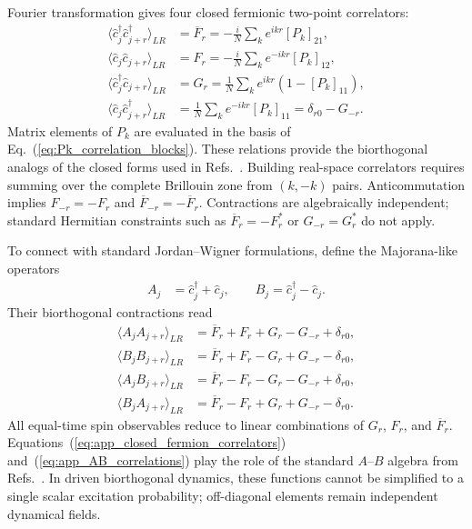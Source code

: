 \documentclass[aps,prb,reprint,superscriptaddress,amsmath,amssymb,floatfix]{revtex4-2}
\begin{document}
  Fourier transformation gives four closed fermionic two-point correlators:
\begin{equation}
\begin{aligned}
\langle \hat c_j^\dagger\hat c_{j+r}^\dagger \rangle_{LR} &= \overline F_r = -\frac{i}{N} \sum_k e^{ikr} \left[P_k\right]_{21}, \\ \langle \hat c_j\hat c_{j+r} \rangle_{LR} &= F_r = -\frac{i}{N} \sum_k e^{-ikr} \left[P_k\right]_{12}, \\ \langle \hat c_j^\dagger\hat c_{j+r} \rangle_{LR} &= G_r = \frac{1}{N} \sum_k e^{ikr} \left( 1-\left[P_k\right]_{11} \right), \\ \langle \hat c_j\hat c_{j+r}^\dagger \rangle_{LR} &= \frac{1}{N} \sum_k e^{-ikr} \left[P_k\right]_{11} = \delta_{r0}-G_{-r}.
\end{aligned} \label{eq:app_closed_fermion_correlators}
\end{equation}
Matrix elements of $P_k$ are evaluated in the basis of Eq.~(\ref{eq:Pk_correlation_blocks}). These relations provide the biorthogonal analogs of the closed forms used in Refs.~\cite{JafariPRR2025,NajiPRB2025}. Building real-space correlators requires summing over the complete Brillouin zone from $(k,-k)$ pairs. Anticommutation implies $F_{-r}=-F_r$ and $\overline F_{-r}=-\overline F_r$. Contractions are algebraically independent; standard Hermitian constraints such as $\overline F_r=-F_r^*$ or $G_{-r}=G_r^*$ do not apply.

  To connect with standard Jordan--Wigner formulations, define the Majorana-like operators
\begin{equation}
\begin{aligned}
A_j &= \hat c_j^\dagger+\hat c_j, \qquad B_j = \hat c_j^\dagger-\hat c_j .
\end{aligned} \label{eq:app_AB_definition}
\end{equation}
Their biorthogonal contractions read
\begin{equation}
\begin{aligned}
\langle A_jA_{j+r}\rangle_{LR} &= \overline F_r+F_r+G_r-G_{-r}+\delta_{r0}, \\ \langle B_jB_{j+r}\rangle_{LR} &= \overline F_r+F_r-G_r+G_{-r}-\delta_{r0}, \\ \langle A_jB_{j+r}\rangle_{LR} &= \overline F_r-F_r-G_r-G_{-r}+\delta_{r0}, \\ \langle B_jA_{j+r}\rangle_{LR} &= \overline F_r-F_r+G_r+G_{-r}-\delta_{r0}. \end{aligned}
\label{eq:app_AB_correlations}
\end{equation}
All equal-time spin observables reduce to linear combinations of $G_r$, $F_r$, and $\overline F_r$. Equations~(\ref{eq:app_closed_fermion_correlators}) and~(\ref{eq:app_AB_correlations}) play the role of the standard $A$--$B$ algebra from Refs.~\cite{JafariPRR2025,NajiPRB2025}. In driven biorthogonal dynamics, these functions cannot be simplified to a single scalar excitation probability; off-diagonal elements remain independent dynamical fields.
\end{document}

